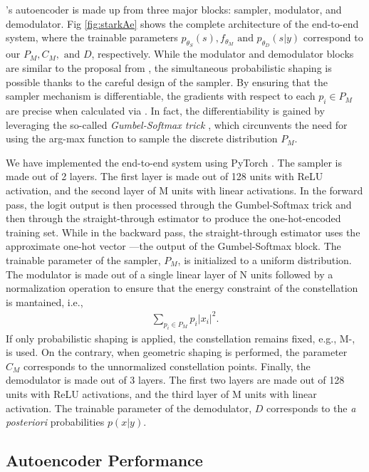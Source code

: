 \citeauthor{Stark}'s autoencoder is made up from three major blocks: sampler, modulator, and demodulator. Fig \ref{fig:starkAe} shows the complete architecture of the end-to-end system, where the trainable parameters $p_{\theta_S}(s), f_{\theta_M} \text{ and } p_{\theta_D}(s|y)$ correspond to our $P_M, C_M, \text{ and } D$, respectively. While the modulator and demodulator blocks are similar to the proposal from \cite{O'Shea}, the simultaneous probabilistic shaping is possible thanks to the careful design of the sampler. By ensuring that the sampler mechanism is differentiable, the gradients with respect to each $p_i \in P_M$ are precise when calculated via . In fact, the differentiability is gained by leveraging the so-called \textit{Gumbel-Softmax trick} \cite{JANG}, which circunvents the need for using the arg-max function to sample the discrete distribution $P_M$.

We have implemented the end-to-end system using PyTorch \cite{PyTorch}. The sampler is made out of 2 layers. The first layer is made out of 128 units with ReLU activation, and the second layer of M units with linear activations. In the forward pass, the logit output is then processed through the Gumbel-Softmax trick and then through the straight-through estimator to produce the one-hot-encoded training set. While in the backward pass, the straight-through estimator uses the approximate one-hot vector ---the output of the Gumbel-Softmax block. The trainable parameter of the sampler, $P_M$, is initialized to a uniform distribution.
The modulator is made out of a single linear layer of N units followed by a normalization operation to ensure that the energy constraint of the constellation is mantained, i.e.,
\begin{align}
	\sum\limits_{p_i \in P_M} p_i |x_i|^2.
\end{align}
If only probabilistic shaping is applied, the constellation remains fixed, e.g., M-, is used. On the contrary, when geometric shaping is performed, the parameter $C_M$ corresponds to the unnormalized constellation points.
Finally, the demodulator is made out of 3 layers. The first two layers are made out of 128 units with ReLU activations, and the third layer of M units with linear activation. The trainable parameter of the demodulator, $D$ corresponds to the \textit{a posteriori} probabilities $p(x|y)$.

\subsection{Autoencoder Performance}

